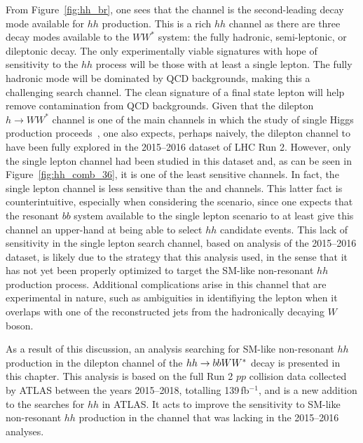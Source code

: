 From Figure~\ref{fig:hh_br}, one sees that the \bbww channel is the second-leading decay mode
available for $hh$ production.
This is a rich $hh$ channel as there are three decay modes available to the $WW^*$ system: the fully hadronic, semi-leptonic, or dileptonic decay.
The only experimentally viable signatures with hope of sensitivity to the $hh$ process will be those with at least a single lepton.
The fully hadronic mode will be dominated by QCD backgrounds, making this a challenging search channel.
The clean signature of a final state lepton will help remove contamination from QCD backgrounds.
Given that the dilepton $h \rightarrow WW^*$ channel is one of the main channels in which the study
of single Higgs production proceeds~\cite{Aaboud:2018jqu,Aad:2016lvc,ATLAS:2014aga}, one also expects, perhaps naively, the dilepton \bbww 
channel to have been fully explored in the 2015--2016 dataset of LHC Run 2.
However, only the single lepton channel had been studied in this dataset and, as can be seen in Figure~\ref{fig:hh_comb_36},
it is one of the least sensitive channels.
In fact, the single lepton \bbww channel is less sensitive than the \wwww and \wwyy channels.
This latter fact is counterintuitive, especially when considering the \wwww scenario, since
one expects that the resonant $bb$ system available to the single lepton \bbww scenario
to at least give this channel an upper-hand at being able to select $hh$ candidate events.
This lack of sensitivity in the single lepton \bbww search channel, based on analysis of the 2015--2016 dataset, is likely due
to the strategy that this analysis used, in the sense that it has not yet been properly optimized to target
the SM-like non-resonant $hh$ production process.
Additional complications arise in this channel that are experimental in nature, such as ambiguities
in identifiying the lepton when it overlaps with one of the reconstructed jets from the hadronically decaying $W$
boson.

As a result of this discussion, an analysis searching for SM-like non-resonant $hh$ production in the dilepton channel
of the $hh \rightarrow bbWW^*$ decay is presented in this chapter.
This analysis is based on the full Run 2 $pp$ collision data collected by ATLAS between the years
2015--2018, totalling 139\,fb$^{-1}$, and is a new addition to the searches for $hh$ in ATLAS.
It acts to improve the sensitivity to SM-like non-resonant $hh$ production in the \bbww channel that
was lacking in the 2015--2016 analyses.

